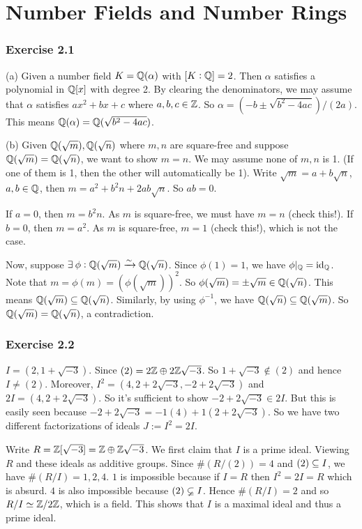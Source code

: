 \documentclass[../Marcus.tex]{subfiles}
\begin{document}
	
\chapter{Number Fields and Number Rings}

\subsection*{Exercise 2.1}

(a) Given a number field $K=\mathbb{Q}(\alpha)$ with $[K:\mathbb{Q}]=2$. Then $\alpha$ satisfies a polynomial in $\mathbb{Q}[x]$ with degree 2. By clearing the denominators, we may assume that $\alpha$ satisfies $ax^2+bx+c$ where $a,b,c\in \mathbb{Z}$. So $\alpha=(-b\pm \sqrt{b^2-4ac})/(2a)$. This means $\mathbb{Q}(\alpha)=\mathbb{Q}(\sqrt{b^2-4ac})$.

(b) Given $\mathbb{Q}(\sqrt{m}),\mathbb{Q}(\sqrt{n})$ where $m,n$ are square-free and suppose $\mathbb{Q}(\sqrt{m})=\mathbb{Q}(\sqrt{n})$, we want to show $m=n$. We may assume none of $m,n$ is 1. (If one of them is 1, then the other will automatically be 1). Write $\sqrt{m}=a+b\sqrt{n}$, $a,b\in\mathbb{Q}$, then $m=a^2+b^2n+2ab\sqrt{n}$. So $ab=0$.

If $a=0$, then $m=b^2n$. As $m$ is square-free, we must have $m=n$ (check this!). If $b=0$, then $m=a^2$. As $m$ is square-free, $m=1$ (check this!), which is not the case.

Now, suppose $\exists \phi:\QQ(\sqrt{m})\isoto\QQ(\sqrt{n})$. Since $\phi(1)=1$, we have $\phi |_{\mathbb{Q}}=\operatorname{id}_{\mathbb{Q}}$. Note that $m=\phi(m)=(\phi(\sqrt{m}))^2$. So $\phi(\sqrt{m})=\pm \sqrt{m}\in \mathbb{Q}(\sqrt{n})$. This means $\mathbb{Q}(\sqrt{m})\subseteq\mathbb{Q}(\sqrt{n})$. Similarly, by using $\phi^{-1}$, we have $\mathbb{Q}(\sqrt{n})\subseteq\mathbb{Q}(\sqrt{m})$. So $\mathbb{Q}(\sqrt{m})=\mathbb{Q}(\sqrt{n})$, a contradiction.

\subsection*{Exercise 2.2}

$I=(2,1+\sqrt{-3})$. Since $(2)=2\mathbb{Z}\oplus2\mathbb{Z}\sqrt{-3}$. So $1+\sqrt{-3}\notin(2)$ and hence $I\neq(2)$. Moreover, $I^2=(4,2+2\sqrt{-3},-2+2\sqrt{-3})$ and $2I=(4,2+2\sqrt{-3})$. So it's sufficient to show $-2+2\sqrt{-3}\in 2I$. But this is easily seen because $-2+2\sqrt{-3}=-1(4)+1(2+2\sqrt{-3})$. So we have two different factorizations of ideals $J:=I^2=2I$.

Write $R=\mathbb{Z}[\sqrt{-3}]=\mathbb{Z}\oplus\mathbb{Z}\sqrt{-3}$. We first claim that $I$ is a prime ideal. Viewing $R$ and these ideals as additive groups. Since $\#(R/(2))=4$ and $(2)\subseteq I$, we have $\#(R/I)=1,2,4$. $1$ is impossible because if $I=R$ then $I^2=2I=R$ which is absurd. $4$ is also impossible because $(2)\varsubsetneq I$. Hence $\#(R/I)=2$ and so $R/I\simeq \mathbb{Z}/2\mathbb{Z}$, which is a field. This shows that $I$ is a maximal ideal and thus a prime ideal.
\end{document}
